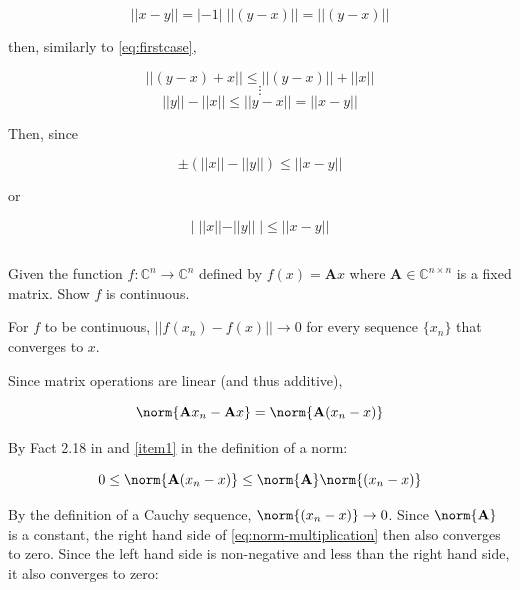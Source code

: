 \documentclass{template}
\begin{document}
\begin{equation}
    ||x-y|| = |-1|\;||(y-x)|| = ||(y-x)||
\end{equation}

then, similarly to \autoref{eq:firstcase},

\begin{equation}
    || (y-x)+x || \leq || (y-x)|| + || x ||
\end{equation}
\begin{equation*}
    \vdots
\end{equation*}
\begin{equation}
    || y || - || x || \leq || y-x|| = ||x-y|| 
\end{equation}

Then, since 

\begin{equation}
    \pm(|| x || - || y ||) \leq || x-y|| 
\end{equation}

or

\begin{equation}
    |\;||x|| - ||y||\;| \leq||x-y||
\end{equation}

\subsection{}

Given the function $f:\mathbb{C}^n \rightarrow \mathbb{C}^n$ defined by $f(x) = \mathbf{A}x$ where $\mathbf{A}\in \mathbb{C}^{n\times n}$ is a fixed matrix. Show $f$ is continuous.

For $f$ to be continuous, $||f(x_n)-f(x)||\rightarrow 0$ for every sequence $\{x_n\}$ that converges to $x$. 

Since matrix operations are linear (and thus additive), 

\begin{equation}
    \norm{\mathbf{A}x_n - \mathbf{A}x} = \norm{\mathbf{A}(x_n - x)}
\end{equation}

By Fact 2.18 in \cite{ipsen2009numerical} and \autoref{item1} in the definition of a norm:

\begin{equation}\label{eq:norm-multiplication}
    0 \leq \norm{\mathbf{A}(x_n - x)} \leq \norm{\mathbf{A}} \norm{(x_n - x)}
\end{equation}

By the definition of a Cauchy sequence, $\norm{(x_n - x)} \rightarrow 0$. Since $\norm{\mathbf{A}}$ is a constant, the right hand side of \autoref{eq:norm-multiplication} then also converges to zero. Since the left hand side is non-negative and less than the right hand side, it also converges to zero:
\end{document}
